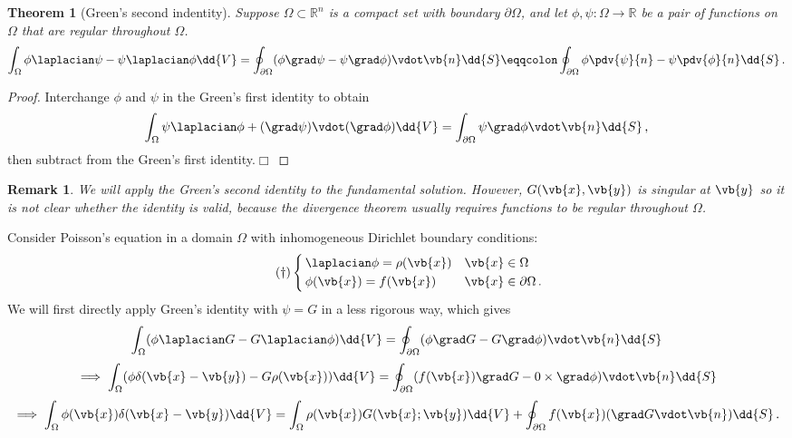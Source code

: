 \documentclass{article}
\theoremstyle{plain}\theoremheaderfont{\normalfont\itshape}\theorembodyfont{\rmfamily}\theoremseparator{.}\newtheorem*{rem}{Remark}\newtheorem*{ex}{Example}\newtheorem*{proof}{Proof}\newtheorem*{altp}{Alternative proof}
\theoremstyle{plain}\theoremheaderfont{\normalfont\bfseries}\theorembodyfont{\rmfamily}\theoremseparator{.}\newtheorem{thm}{Theorem}[section]\newtheorem{lem}[thm]{Lemma}\newtheorem{prop}[thm]{Proposition}\newtheorem*{cor}{Corollary}\newtheorem{defn}[thm]{Definition}\newtheorem{clm}[thm]{Claim}\newtheorem{clminproof}{Claim}
\theoremstyle{break}\theoremheaderfont{\normalfont\itshape}\theorembodyfont{\rmfamily}\theoremseparator{.\medskip}\newtheorem*{proofskip}{Proof}\newtheorem*{exs}{Examples}\newtheorem*{rems}{Remarks}
\theoremstyle{break}\theoremheaderfont{\normalfont\bfseries}\theorembodyfont{\rmfamily}\theoremseparator{.\medskip}\newtheorem{lemskip}[thm]{Lemma}\newtheorem{defnskip}[thm]{Definition}\newtheorem{propskip}[thm]{Proposition}\newtheorem{thmskip}[thm]{Theorem}
\numberwithin{equation}{section}
\newcommand{\qed}{\hfill\ensuremath{\Box}}
\begin{document}
	\begin{thm}[Green's second indentity]		
		Suppose \(\Omega\subset\mathbb{R}^n\) is a compact set with boundary \(\partial\Omega\), and let \(\phi,\psi:\Omega\to\mathbb{R}\) be a pair of functions on \(\Omega\) that are regular throughout \(\Omega\).
		\[\int_\Omega\phi\laplacian\psi-\psi\laplacian\phi\dd{V}=\oint_{\partial\Omega}(\phi\grad\psi-\psi\grad\phi)\vdot\vb{n}\dd{S}\eqqcolon\oint_{\partial\Omega}\phi\pdv{\psi}{n}-\psi\pdv{\phi}{n}\dd{S}\,.\]
	\end{thm}
	\begin{proof} 
		Interchange \(\phi\) and \(\psi\) in the Green's first identity to obtain
		\[\int_\Omega\psi\laplacian\phi+(\grad\psi)\vdot(\grad\phi)\dd{V}=\int_{\partial\Omega}\psi\grad\phi\vdot\vb{n}\dd{S}\,,\]
		then subtract from the Green's first identity.\qed
	\end{proof}
	\begin{rem}
		We will apply the Green's second identity to the fundamental solution. However, \(G(\vb{x},\vb{y})\) is singular at \(\vb{y}\) so it is not clear whether the identity is valid, because the divergence theorem usually requires functions to be regular throughout \(\Omega\).
	\end{rem}
	
	Consider Poisson's equation in a domain \(\Omega\) with inhomogeneous Dirichlet boundary conditions:
	\begin{equation}\tag{\(\dagger\)}
		\left\{\begin{aligned}
			&\,\laplacian\phi=\rho(\vb{x}) && \vb{x}\in\Omega\\
			&\,\phi(\vb{x})=f(\vb{x}) && \vb{x}\in\partial\Omega\,.
		\end{aligned}\right.
	\end{equation}
	We will first directly apply Green's identity with \(\psi=G\) in a less rigorous way, which gives
	\[\int_\Omega(\phi\laplacian G-G\laplacian\phi)\dd{V}=\oint_{\partial\Omega}(\phi\grad G-G\grad\phi)\vdot\vb{n}\dd{S}\]
	\[\implies \int_\Omega(\phi\delta(\vb{x}-\vb{y})-G\rho(\vb{x}))\dd{V}=\oint_{\partial\Omega}(f(\vb{x})\grad G-0\times\grad\phi)\vdot\vb{n}\dd{S}\]
	\[\implies \int_\Omega\phi(\vb{x})\delta(\vb{x}-\vb{y})\dd{V}=\int_\Omega\rho(\vb{x})G(\vb{x};\vb{y})\dd{V}+\oint_{\partial\Omega}f(\vb{x})(\grad G\vdot\vb{n})\dd{S}\,.\]
\end{document}
